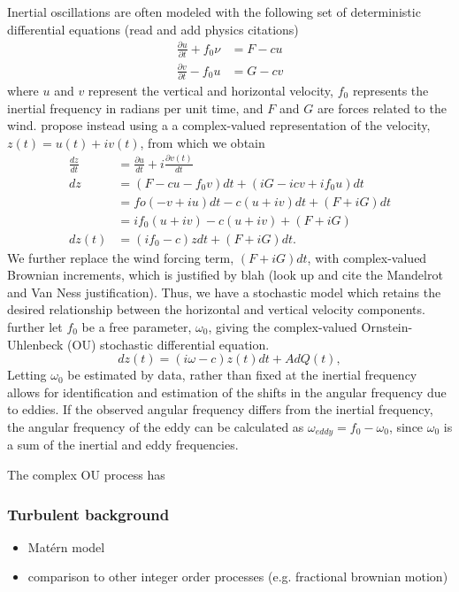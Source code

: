 \documentclass{stat572Style}
\begin{document}
Inertial oscillations are often modeled with the following set of deterministic differential equations (read and add physics citations)
\begin{align}
\frac{\partial u }{\partial t}  + f_{0} \nu &= F - cu \\ \nonumber
\frac{\partial v}{\partial t} - f_{0}u &= G - cv
\end{align}
where $u$ and $v$ represent the vertical and horizontal velocity, $f_{0}$ represents the inertial frequency in radians per unit time, and $F$ and $G$ are forces related to the wind. \citet{Sykulski2016} propose instead using a a complex-valued representation of the velocity, $z(t) = u(t) + i v(t)$,  from which we obtain 
\begin{align*}
\frac{dz}{dt} &= \frac{\partial u}{dt} + i\frac{\partial v(t)}{dt}\\
dz &= (F - c u- f_{0}v)dt + (iG - icv + if_{0}u)dt\\
&= fo(-v + iu)dt - c(u + iv)dt + (F + iG)dt\\
&= if_{0}(u + iv) - c(u + iv) + (F + iG)\\
dz(t) &= (if_{0} - c)z dt + (F + iG)dt. 
\end{align*}
We further replace the wind forcing term, $(F + iG)dt$, with complex-valued Brownian increments, which is justified by blah (look up and cite the Mandelrot and Van Ness justification). Thus, we have a stochastic model which retains the desired relationship between the horizontal and vertical velocity components. \citet{Sykulski2016} further let $f_{0}$ be a free parameter, $\omega_{0}$, giving the complex-valued Ornstein-Uhlenbeck (OU) stochastic differential equation.
\begin{equation}
dz(t) = (i \omega -c) z(t) dt + A d Q(t), 
\end{equation}
Letting $\omega_{0}$ be estimated by data, rather than fixed at the inertial frequency allows for identification and estimation of the shifts in the angular frequency due to eddies. If the observed angular frequency differs from the inertial frequency, the angular frequency of the eddy can be calculated as $\omega_{eddy} = f_{0} - \omega_{0}$, since $\omega_{0}$ is a sum of the inertial and eddy frequencies.

The complex OU process has 


		\subsubsection{Turbulent background}
				\begin{itemize}
					\item Mat\'{e}rn model 
					\item comparison to other integer order processes (e.g. fractional brownian motion)
				\end{itemize}
		
\end{document}
